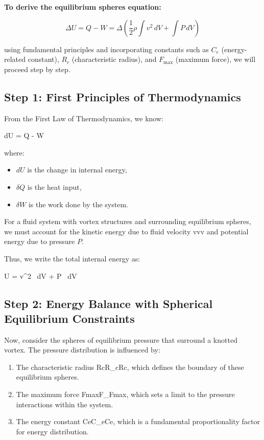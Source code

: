 

\textbf{To derive the equilibrium spheres equation:}

\[
\Delta U = Q - W = \Delta \left( \frac{1}{2} \rho \int v^2 \, dV + \int P \, dV \right)
\]

using fundamental principles and incorporating constants such as $C_e$ (energy-related constant), $R_c$ (characteristic radius), and $F_{\max}$ (maximum force), we will proceed step by step.





\subsection*{Step 1: First Principles of Thermodynamics}
From the First Law of Thermodynamics, we know:

dU = \delta Q - \delta W

where:

\begin{itemize}
\item $dU$ is the change in internal energy,
\item $\delta Q$ is the heat input,
\item $\delta W$ is the work done by the system.
\end{itemize}
For a fluid system with vortex structures and surrounding equilibrium spheres, we must account for the kinetic energy due to fluid velocity vvv and potential energy due to pressure $P$.

Thus, we write the total internal energy as:

U =  \rho \int v^2 \, dV + \int P \, dV



\subsection*{Step 2: Energy Balance with Spherical Equilibrium Constraints}
Now, consider the spheres of equilibrium pressure that surround a knotted vortex. The pressure distribution is influenced by:

\begin{enumerate}
\item The characteristic radius RcR_cRc​, which defines the boundary of these equilibrium spheres.
\item The maximum force Fmax⁡F_{\max}Fmax​, which sets a limit to the pressure interactions within the system.
\item The energy constant CeC_eCe​, which is a fundamental proportionality factor for energy distribution.
\end{enumerate}
